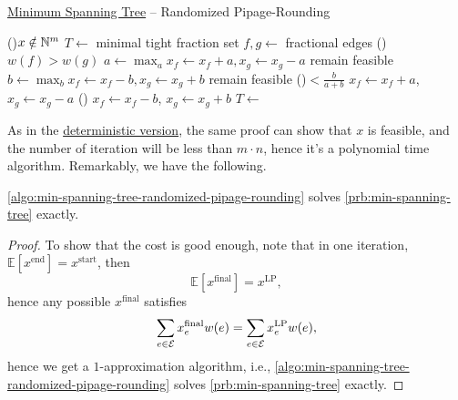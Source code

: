 \begin{algorithm}[H]\label{algo:min-spanning-tree-randomized-pipage-rounding}
	\DontPrintSemicolon
	\caption{\hyperref[prb:min-spanning-tree]{Minimum Spanning Tree} -- Randomized Pipage-Rounding}
	\BlankLine
	\While(){\(x \notin \mathbb{\MakeUppercase{n}} ^{m}\)}{
		\(T\gets\) minimal tight fraction set
		\(f, g\gets \) fractional edges\label{algo:min-spanning-tree-randomized-pipage-rounding-fg}
		\If(){\(w(f) > w(g)\)}{
			\;
		}
		\(a\gets \max_a x_f \gets x_f + a, x_g \gets x_g - a\) remain feasible
		\(b\gets \max_b x_f \gets x_f - b, x_g \gets x_g + b\) remain feasible
		\uIf(){\(< \frac{b}{a + b}\)}{
			\(x_f \gets x_f + a\), \(x_g \gets x_g - a\)\;
		}\Else(){
			\(x_f \gets x_f - b\), \(x_g \gets x_g + b\)\;
		}
	}
	\;
	\(T\gets\)
	\;
\end{algorithm}

As in the \hyperref[algo:min-spanning-tree-pipage-rounding]{deterministic version}, the same proof can show that \(x\) is feasible, and the number of iteration will be less than \(m \cdot n\), hence it's a polynomial time algorithm. Remarkably, we have the following.

\begin{theorem}
	\autoref{algo:min-spanning-tree-randomized-pipage-rounding} solves \autoref{prb:min-spanning-tree} exactly.
\end{theorem}
\begin{proof}
	To show that the cost is good enough, note that in one iteration, \(\mathbb{E}\left[x^{\text{end} } \right] = x^{\text{start} }\), then
	\[
		\mathbb{E}\left[ x^{\text{final}} \right] = x^{\text{LP} },
	\]
	hence any possible \(x^{\text{final} }\) satisfies
	\[
		\sum_{e\in \mathcal{\MakeUppercase{e}} } x^{\text{final}}_e w(e)= \sum_{e\in \mathcal{\MakeUppercase{e}} } x_e^{\text{LP}} w(e),
	\]
	hence we get a \(1\)-approximation algorithm, i.e., \autoref{algo:min-spanning-tree-randomized-pipage-rounding} solves \autoref{prb:min-spanning-tree} exactly.
\end{proof}


